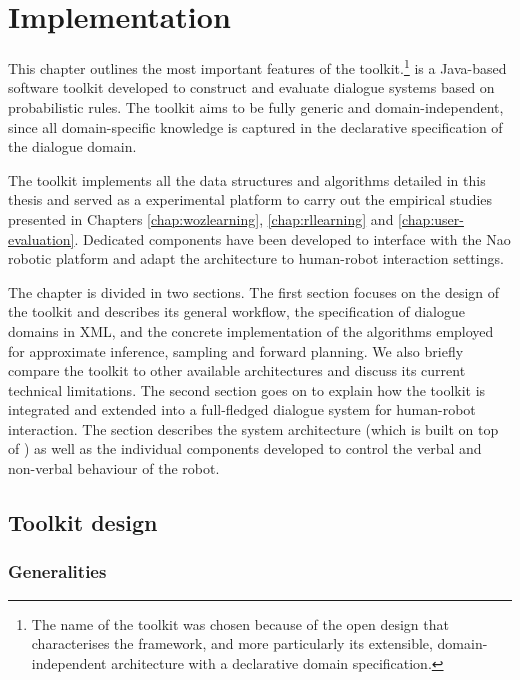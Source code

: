 \chapter{Implementation}
\label{chap:opendial}

This chapter outlines the most important features of the \opendial{} toolkit.\footnote{The name of the toolkit was chosen because of the open design that characterises the framework, and more particularly its extensible, domain-independent architecture with a declarative domain specification.} \opendial{} is a Java-based software toolkit developed to construct and evaluate dialogue systems based on probabilistic rules. The toolkit aims to be fully generic and domain-independent, since all domain-specific knowledge is captured in the declarative specification of the dialogue domain.

The toolkit implements all the data structures and algorithms detailed in this thesis and served as a experimental platform to carry out the empirical studies presented in Chapters \ref{chap:wozlearning}, \ref{chap:rllearning} and \ref{chap:user-evaluation}. Dedicated components have been developed to interface \opendial{} with the Nao robotic platform and adapt the architecture to human-robot interaction settings.

The chapter is divided in two sections.  The first section focuses on the design of the \opendial{} toolkit and describes its general workflow, the specification of dialogue domains in XML, and the concrete implementation of the algorithms employed for approximate inference, sampling and forward planning. We also briefly compare the toolkit to other available architectures and discuss its current technical limitations.  The second section goes on to explain how the toolkit is integrated and extended into a full-fledged dialogue system for human-robot interaction. The section describes the system architecture (which is built on top of \opendial{}) as well as the individual components developed to control the verbal and non-verbal behaviour of the robot.  

\section{Toolkit design}
\label{sec:genarchitecture}

\subsection{Generalities}

